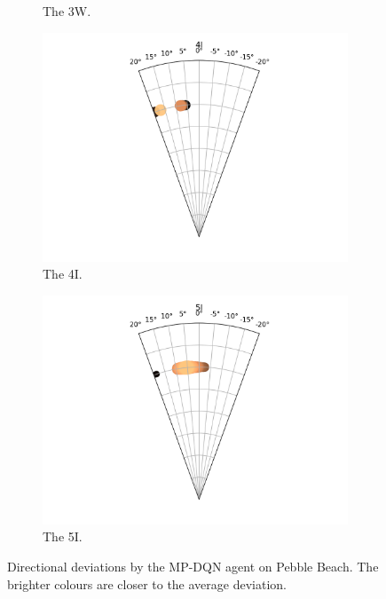 \documentclass{kththesis}
\begin{document}
\begin{figure}
\begin{subfigure}{0.4\textwidth}
    \caption{The 3W.}
    \label{fig:3W_pebble_deviation}
    \end{subfigure}
    \begin{subfigure}{0.4\textwidth}
    \centering
    \includegraphics[width=\textwidth]{AgentDirectionChoices/MPDQN_Pebble_Direction_Choices_4I.png} 
    \caption{The 4I.}
    \label{fig:4I_pebble_deviation}
    \end{subfigure}
    \begin{subfigure}{0.4\textwidth}
    \centering
    \includegraphics[width=\textwidth]{AgentDirectionChoices/MPDQN_Pebble_Direction_Choices_5I.png} 
    \caption{The 5I.}
    \label{fig:5I_pebble_deviation}
    \end{subfigure}
    \caption{Directional deviations by the MP-DQN agent on Pebble Beach. The brighter colours are closer to the average deviation.}
\end{figure}
\end{document}
